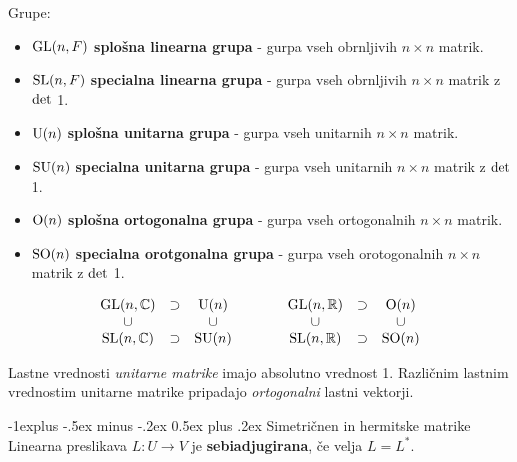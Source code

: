 \documentclass[a4paper,landscape]{article}
\makeatletter
\renewcommand{\subsection}{\@startsection{subsection}{2}{0mm}%
                                {-1explus -.5ex minus -.2ex}%
                                {0.5ex plus .2ex}%
                                {\normalfont\normalsize\bfseries}}
\makeatother
\begin{document}
\begin{multicols}{3}
Grupe:
\begin{itemize}
    \item $\textmd{GL}(n,F)$ \textbf{splošna linearna grupa} - gurpa vseh obrnljivih $n \times n$ matrik.
    \item $\textmd{SL}(n,F)$ \textbf{specialna linearna grupa} - gurpa vseh obrnljivih $n \times n$ matrik z $\textmd{det}$ 1.
    \item $\textmd{U}(n)$ \textbf{splošna unitarna grupa} - gurpa vseh unitarnih $n \times n$ matrik.
    \item $\textmd{SU}(n)$ \textbf{specialna unitarna grupa} - gurpa vseh unitarnih $n \times n$ matrik z $\textmd{det}$ 1.
    \item $\textmd{O}(n)$ \textbf{splošna ortogonalna grupa} - gurpa vseh ortogonalnih $n \times n$ matrik.
    \item $\textmd{SO}(n)$ \textbf{specialna orotgonalna grupa} - gurpa vseh orotogonalnih $n \times n$ matrik z $\textmd{det}$ 1.
\end{itemize}

\begin{equation*}
    \begin{aligned}
        \begin{matrix}
            \textmd{GL}(n, \mathbb{C}) & \supset & \textmd{U}(n) \\
            \cup &  & \cup \\
            \textmd{SL}(n, \mathbb{C}) & \supset & \textmd{SU}(n) \\
        \end{matrix}
        \qquad \qquad
        \begin{matrix}
            \textmd{GL}(n, \mathbb{R}) & \supset & \textmd{O}(n) \\
            \cup &  & \cup \\
            \textmd{SL}(n, \mathbb{R}) & \supset & \textmd{SO}(n) \\
        \end{matrix}
    \end{aligned}
\end{equation*}

Lastne vrednosti \emph{unitarne matrike} imajo absolutno vrednost 1.
Različnim lastnim vrednostim unitarne matrike pripadajo \emph{ortogonalni} lastni vektorji.

\subsection{Simetričnen in hermitske matrike}
Linearna preslikava $L:U \to V$ je \textbf{sebiadjugirana}, če velja $L=L^*$. 


\end{multicols}
\end{document}
